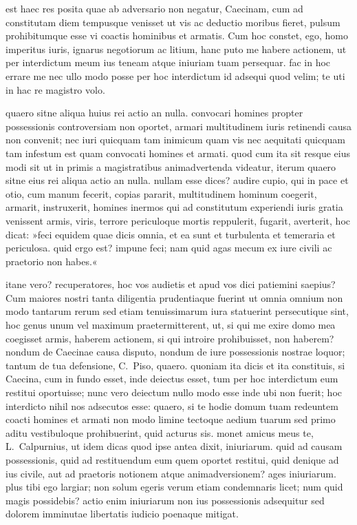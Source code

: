 est haec res posita quae ab adversario non negatur, Caecinam, cum ad constitutam diem tempusque venisset ut vis ac deductio moribus fieret, pulsum prohibitumque esse vi coactis hominibus et armatis. Cum hoc constet, ego, homo imperitus iuris, ignarus negotiorum ac litium, hanc puto me habere actionem, ut per interdictum meum ius teneam atque iniuriam tuam persequar. fac in hoc errare me nec ullo modo posse per hoc interdictum id adsequi quod velim; te uti in hac re magistro volo.

 quaero sitne aliqua huius rei actio an nulla. convocari homines propter possessionis controversiam non oportet, armari multitudinem iuris retinendi causa non convenit; nec iuri quicquam tam inimicum quam vis nec aequitati quicquam tam infestum est quam convocati homines et armati. quod cum ita sit resque eius modi sit ut in primis a magistratibus animadvertenda videatur, iterum quaero sitne eius rei aliqua actio an nulla. nullam esse dices? audire cupio, qui in pace et otio, cum manum fecerit, copias pararit, multitudinem hominum coegerit, armarit, instruxerit, homines inermos qui ad constitutum experiendi iuris gratia venissent armis, viris, terrore periculoque mortis reppulerit, fugarit, averterit, hoc dicat:
 »feci equidem quae dicis omnia, et ea sunt et turbulenta et temeraria et periculosa. quid ergo est? impune feci; nam quid agas mecum ex iure civili ac praetorio non habes.«

itane vero? recuperatores, hoc vos audietis et apud vos dici patiemini saepius? Cum maiores nostri tanta diligentia prudentiaque fuerint ut omnia omnium non modo tantarum rerum sed etiam tenuissimarum iura statuerint persecutique sint, hoc genus unum vel maximum praetermitterent, ut, si qui me exire domo mea coegisset armis, haberem actionem, si qui introire prohibuisset, non haberem? nondum de Caecinae causa disputo, nondum de iure possessionis nostrae loquor; tantum de tua defensione, C.~Piso, quaero.  quoniam ita dicis et ita constituis, si Caecina, cum in fundo esset, inde deiectus esset, tum per hoc interdictum eum restitui oportuisse; nunc vero deiectum nullo modo esse inde ubi non fuerit; hoc interdicto nihil nos adsecutos esse: quaero, si te hodie domum tuam redeuntem coacti homines et armati non modo limine tectoque aedium tuarum sed primo aditu vestibuloque prohibuerint, quid acturus sis. monet amicus meus te, L.~Calpurnius, ut idem dicas quod ipse antea dixit, iniuriarum. quid ad causam possessionis, quid ad restituendum eum quem oportet restitui, quid denique ad ius civile, aut ad praetoris notionem atque animadversionem? ages iniuriarum. plus tibi ego largiar; non solum egeris verum etiam condemnaris licet; num quid magis possidebis? actio enim iniuriarum non ius possessionis adsequitur sed dolorem imminutae libertatis iudicio poenaque mitigat.

